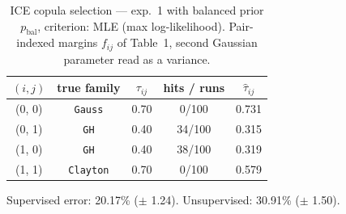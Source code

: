 \begin{table}[htbp]
  \centering
  \caption{ICE copula selection — exp.\ 1 with balanced prior $p_{\text{bal}}$, criterion: MLE (max log-likelihood). Pair-indexed margins $f_{ij}$ of Table~1, second Gaussian parameter read as a variance.}
  \label{tab:exp3-exp1_bal_p__mle}
  \begin{tabular}{ccccc}
    \toprule
    $(i, j)$ & true family & $\tau_{ij}$ & hits / runs & $\hat\tau_{ij}$ \\
    \midrule
    (0, 0) & \texttt{Gauss} & 0.70 & 0/100 & 0.731 \\
    (0, 1) & \texttt{GH} & 0.40 & 34/100 & 0.315 \\
    (1, 0) & \texttt{GH} & 0.40 & 38/100 & 0.319 \\
    (1, 1) & \texttt{Clayton} & 0.70 & 0/100 & 0.579 \\
    \bottomrule
  \end{tabular}
  \par\smallskip Supervised error: 20.17\% ($\pm$ 1.24). Unsupervised: 30.91\% ($\pm$ 1.50).
\end{table}
